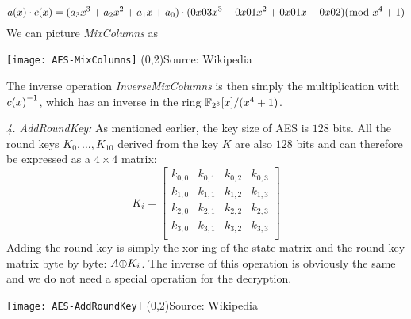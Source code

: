 \[a(x)\cdot c(x)=(a_3x^3+a_2x^2+a_1x+a_0)\cdot (0x03x^3+0x01x^2+0x01x+0x02)
({\bmod}\; x^4+1)\] We can picture
\textit{MixColumns} as
\begin{center}
  \texttt{[image: AES-MixColumns]}
  (0,2){\tiny Source: Wikipedia}%
\end{center}
The inverse operation \textit{InverseMixColumns} is then simply the
multiplication with ${{c(x)}^{-1}}$, which has an inverse in the ring
${ \mathbb{F}_{2^8}}[x]/(x^4+1)$.


\textit{4. AddRoundKey:}   As mentioned earlier, the key
size of AES is $128$ bits. All the round keys $K_0,\ldots,K_{10}$ derived from
the key $K$ are also $128$ bits and can therefore be expressed as a $4\times4$
matrix:
\[
K_i=
\begin{bmatrix}
  k_{0,0} & k_{0,1} & k_{0,2} & k_{0,3}\\
  k_{1,0} & k_{1,1} & k_{1,2} & k_{1,3}\\
  k_{2,0} & k_{2,1} & k_{2,2} & k_{2,3}\\
  k_{3,0} & k_{3,1} & k_{3,2} & k_{3,3}\\
\end{bmatrix}
\]
Adding the round key is simply the xor-ing of the state matrix and the round key
matrix byte by byte: $A{\oplus} K_i$. The inverse of this operation is obviously the
same and we do not need a special operation for the decryption.

\begin{center}
  \texttt{[image: AES-AddRoundKey]}
  (0,2){\tiny Source: Wikipedia}%
\end{center}



